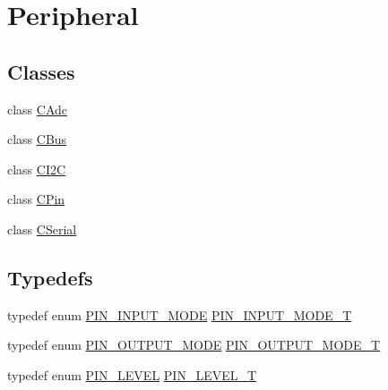 \hypertarget{group___peripheral}{\section{Peripheral}
\label{group___peripheral}
}
\subsection*{Classes}
\begin{DoxyCompactItemize}
\item 
class \hyperlink{class_c_adc}{C\-Adc}
\item 
class \hyperlink{class_c_bus}{C\-Bus}
\item 
class \hyperlink{class_c_i2_c}{C\-I2\-C}
\item 
class \hyperlink{class_c_pin}{C\-Pin}
\item 
class \hyperlink{class_c_serial}{C\-Serial}
\end{DoxyCompactItemize}
\subsection*{Typedefs}
\begin{DoxyCompactItemize}
\item 
typedef enum \hyperlink{group___peripheral_ga16ce6180d8bb2eb23a7df8f8923ea581}{P\-I\-N\-\_\-\-I\-N\-P\-U\-T\-\_\-\-M\-O\-D\-E} \hyperlink{group___peripheral_gad5705547b72a4480dc714447b3bbfb64}{P\-I\-N\-\_\-\-I\-N\-P\-U\-T\-\_\-\-M\-O\-D\-E\-\_\-\-T}
\item 
typedef enum \hyperlink{group___peripheral_ga62483064e24f6949ab0a9b9234b4e549}{P\-I\-N\-\_\-\-O\-U\-T\-P\-U\-T\-\_\-\-M\-O\-D\-E} \hyperlink{group___peripheral_ga29412fef1d1b9fafc0cd270a5d702f28}{P\-I\-N\-\_\-\-O\-U\-T\-P\-U\-T\-\_\-\-M\-O\-D\-E\-\_\-\-T}
\item 
typedef enum \hyperlink{group___peripheral_ga445f12f54192283394084c5d36ab4dd1}{P\-I\-N\-\_\-\-L\-E\-V\-E\-L} \hyperlink{group___peripheral_gac4a9005971c102914017b5e21ae23a19}{P\-I\-N\-\_\-\-L\-E\-V\-E\-L\-\_\-\-T}
\end{DoxyCompactItemize}
